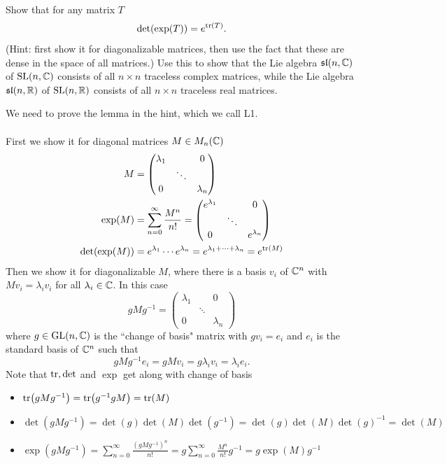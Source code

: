 \documentclass[10pt]{article}
\begin{document}
\begin{example}\label{b2e39}
	Show that for any matrix $T$
	$$
	\det(\exp(T)) = e^{\tr(T)}.
	$$
	(Hint: first show it for diagonalizable matrices, then use the fact that these are dense in the space of all matrices.) Use this to show that the Lie algebra $\mathfrak{sl}(n,\mathbb{C})$ of $\text{SL}(n,\mathbb{C})$ consists of all $n \times n$ traceless complex matrices, while the Lie algebra $\mathfrak{sl}(n,\mathbb{R})$ of $\text{SL}(n,\mathbb{R})$ consists of all $n \times n$ traceless real matrices.
\end{example}
\sol We need to prove the lemma in the hint, which we call L1.\\\\
First we show it for diagonal matrices $M\in M_n(\mathbb{C})$
$$
\begin{aligned}
	M&=\begin{pmatrix}
		\lambda_1&&0\\
		&\ddots&\\
		0&&\lambda_n	
	\end{pmatrix}\\
	\exp(M) &= \sum_{n=0}^{\infty} \frac{M^n}{n!} = \begin{pmatrix}
		e^{\lambda_1}&&0\\
		&\ddots&\\
		0&&e^{\lambda_n}	
	\end{pmatrix}\\
	\det(\exp(M)) &= e^{\lambda_1}\cdots e^{\lambda_n} = e^{\lambda_1+\cdots+\lambda_n} = e^{\tr(M)}
\end{aligned}
$$
Then we show it for diagonalizable $M$, where there is a basis $v_i$ of $\mathbb{C}^n$ with $Mv_i=\lambda_iv_i$ for all $\lambda_i \in \mathbb{C}$. In this case
$$
gMg^{-1}=\begin{pmatrix}
	\lambda_1&&0\\
	&\ddots&\\
	0&&\lambda_n	
\end{pmatrix}
$$
where $g \in \text{GL}(n,\mathbb{C})$ is the ``change of basis" matrix with $gv_i=e_i$ and $e_i$ is the standard basis of $\mathbb{C}^n$ such that
$$
gMg^{-1}e_i = gMv_i = g\lambda_iv_i = \lambda_ie_i.
$$
Note that $\tr,\det$ and $\exp$ get along with change of basis
\begin{itemize}
	\item $\tr(gMg^{-1}) = \tr(g^{-1}gM) = \tr(M)$
	\item $\det(gMg^{-1}) = \det(g)\det(M)\det(g^{-1}) = \det(g)\det(M)\det(g)^{-1} = \det(M)$
	\item $\exp(gMg^{-1}) = \sum_{n=0}^{\infty} \frac{(gMg^{-1})^n}{n!} = g\sum_{n=0}^{\infty} \frac{M^n}{n!}g^{-1} = g\exp(M)g^{-1}$
\end{itemize}
\end{document}
